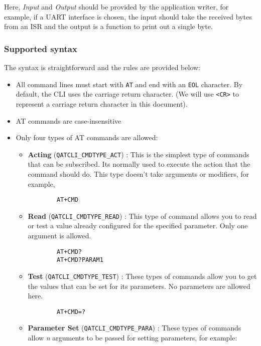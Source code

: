 \begin{tcolorbox}
\HandRight Here, \textit{Input} and \textit{Output} should be provided by the application writer, for example, if a UART interface is chosen, the input should take the received bytes from an ISR and the output is a function to print out a single byte.
\end{tcolorbox}

\subsubsection{Supported syntax} \label{atsyntax}

The syntax is straightforward and the rules are provided below:

\begin{itemize}
    \item All command lines must start with \lstinline{AT} and end with an \lstinline{EOL} character. By default, the CLI uses the carriage return character. (We will use \lstinline{<CR>} to represent a carriage return character in this document).
    \item AT commands are case-insensitive 
    \item Only four types of AT commands are allowed:
    \begin{itemize}
        \item \textbf{Acting} (\lstinline{QATCLI_CMDTYPE_ACT}) : This is the simplest type of commands that can be subscribed. Its normally used to execute the action that the command should do. This type doesn't take arguments or modifiers, for example,
        \begin{lstlisting}
        AT+CMD
        \end{lstlisting}
        \item \textbf{Read} (\lstinline{QATCLI_CMDTYPE_READ}) : This type of command allows you to read or test a value already configured for the specified parameter. Only one argument is allowed.
        \begin{lstlisting}
        AT+CMD?
        AT+CMD?PARAM1
        \end{lstlisting}        
        \item \textbf{Test} (\lstinline{QATCLI_CMDTYPE_TEST}) : These types of commands allow you to get the values that can be set for its parameters. No parameters are allowed here.
        \begin{lstlisting}
        AT+CMD=?
        \end{lstlisting}
        \item \textbf{Parameter Set} (\lstinline{QATCLI_CMDTYPE_PARA}) : These types of commands allow \textit{n} arguments to be passed for setting parameters, for example:

\end{itemize}
\end{itemize}

